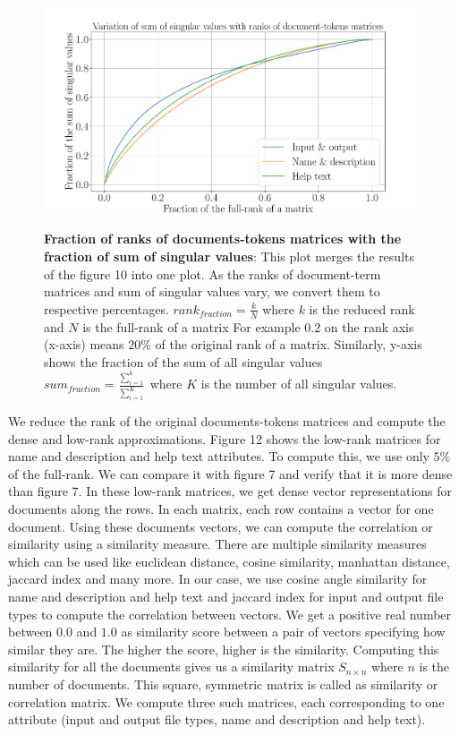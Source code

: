 \begin{figure}[h]
\begin{centering}
    {\includegraphics[scale=0.4]{figures/Fraction_ranks_singular_values.pdf}}
    \caption[Fraction of ranks of documents-tokens matrices with the fraction of sum of singular values]{\textbf{Fraction of ranks of documents-tokens matrices with the fraction of sum of singular values}: This plot merges the results of the figure 10 into one plot. As the ranks of document-term matrices and sum of singular values vary, we convert them to respective percentages. $rank_{fraction} = \frac{k}{N}$ where $k$ is the reduced rank and $N$ is the full-rank of a matrix For example $0.2$ on the rank axis (x-axis) means $20\%$ of the original rank of a matrix. Similarly, y-axis shows the fraction of the sum of all singular values $ sum_{fraction} = \frac{\sum_{i=1}^k}{\sum_{i=1}^K}$ where $K$ is the number of all singular values.}
\end{centering}
\end{figure}

We reduce the rank of the original documents-tokens matrices and compute the dense and low-rank approximations. Figure 12 shows the low-rank matrices for name and description and help text attributes. To compute this, we use only $5\%$ of the full-rank. We can compare it with figure 7 and verify that it is more dense than figure 7. In these low-rank matrices, we get dense vector representations for documents along the rows. In each matrix, each row contains a vector for one document. Using these documents vectors, we can compute the correlation or similarity using a similarity measure. There are multiple similarity measures which can be used like euclidean distance, cosine similarity, manhattan distance, jaccard index and many more. In our case, we use cosine angle similarity for name and description and help text and jaccard index for input and output file types to compute the correlation between vectors. We get a positive real number between $0.0$ and $1.0$ as similarity score between a pair of vectors specifying how similar they are. The higher the score, higher is the similarity. Computing this similarity for all the documents gives us a similarity matrix $S_{n \times n}$ where $n$ is the number of documents. This square, symmetric matrix is called as similarity or correlation matrix. We compute three such matrices, each corresponding to one attribute (input and output file types, name and description and help text).
  
